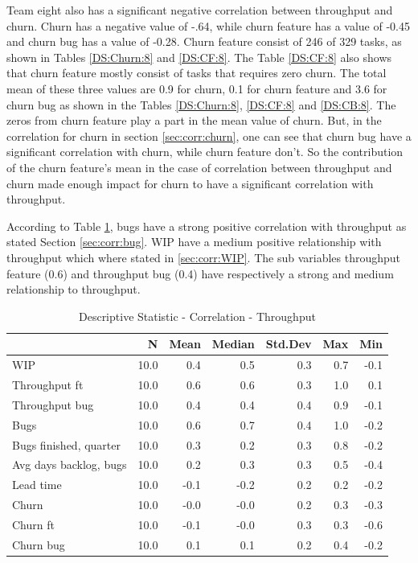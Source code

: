 \documentclass[UKenglish]{ifimaster}  %
\begin{document}
Team eight also has a significant negative correlation between throughput and churn. Churn has a negative value of -.64, while churn feature has a value of -0.45 and churn bug has a value of -0.28. Churn feature consist of 246 of 329 tasks, as shown in Tables \ref{DS:Churn:8} and \ref{DS:CF:8}. The Table \ref{DS:CF:8} also shows that churn feature mostly consist of tasks that requires zero churn. The total mean of these three values are 0.9 for churn, 0.1 for churn feature and 3.6 for churn bug as shown in the Tables   \ref{DS:Churn:8}, \ref{DS:CF:8} and \ref{DS:CB:8}. The zeros from churn feature play a part in the mean value of churn. But, in the correlation for churn in section \ref{sec:corr:churn}, one can see that churn bug have a significant correlation with churn, while churn feature don't. So the contribution of the churn feature's mean in the case of correlation between throughput and churn made enough impact for churn to have a significant correlation with throughput.

According to Table \ref{DS:corr:TP}, bugs have a strong positive correlation with throughput as stated Section \ref{sec:corr:bug}. WIP have a medium positive relationship with throughput which where stated in \ref{sec:corr:WIP}. The sub variables throughput feature (0.6) and throughput bug (0.4) have respectively a strong and medium relationship to throughput. 

\begin{table}[!htbp]
 \centering
 \begin{tabular}{ | l | r | r | r | r | r | r | }
 \hline
& \bf{N} & \bf{Mean} & \bf{Median} & \bf{Std.Dev} & \bf{Max} & \bf{Min} \\ \hline
WIP  & 10.0 & 0.4 & 0.5 & 0.3 & 0.7 & -0.1\\ \hline
Throughput ft  & 10.0 & 0.6 & 0.6 & 0.3 & 1.0 & 0.1\\ \hline
Throughput bug  & 10.0 & 0.4 & 0.4 & 0.4 & 0.9 & -0.1\\ \hline
Bugs  & 10.0 & 0.6 & 0.7 & 0.4 & 1.0 & -0.2\\ \hline
Bugs finished, quarter  & 10.0 & 0.3 & 0.2 & 0.3 & 0.8 & -0.2\\ \hline
Avg days backlog, bugs  & 10.0 & 0.2 & 0.3 & 0.3 & 0.5 & -0.4\\ \hline
Lead time  & 10.0 & -0.1 & -0.2 & 0.2 & 0.2 & -0.2\\ \hline
Churn  & 10.0 & -0.0 & -0.0 & 0.2 & 0.3 & -0.3\\ \hline
Churn ft  & 10.0 & -0.1 & -0.0 & 0.3 & 0.3 & -0.6\\ \hline
Churn bug  & 10.0 & 0.1 & 0.1 & 0.2 & 0.4 & -0.2\\ \hline
\end{tabular}
 \caption{Descriptive Statistic - Correlation - Throughput}
 \label{DS:corr:TP}
 \end{table}
\end{document}
